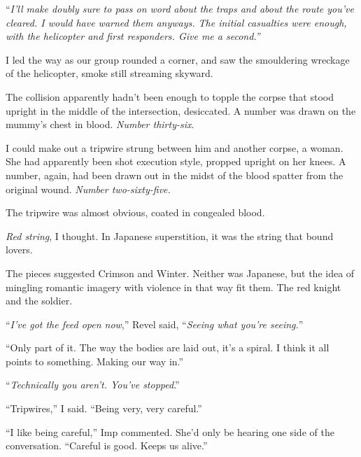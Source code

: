 ``\emph{I'll make doubly sure to pass on word about the traps and about the route you've cleared.  I would have warned them anyways.  The initial casualties were enough, with the helicopter and first responders.  Give me a second.''}



I led the way as our group rounded a corner, and saw the smouldering wreckage of the helicopter, smoke still streaming skyward.



The collision apparently hadn't been enough to topple the corpse that stood upright in the middle of the intersection, desiccated.  A number was drawn on the mummy's chest in blood.  \emph{Number thirty-six}.



I could make out a tripwire strung between him and another corpse, a woman.  She had apparently been shot execution style, propped upright on her knees.  A number, again, had been drawn out in the midst of the blood spatter from the original wound.  \emph{Number two-sixty-five.}



The tripwire was almost obvious, coated in congealed blood.



\emph{Red string}, I thought.  In Japanese superstition, it was the string that bound lovers.



The pieces suggested Crimson and Winter.  Neither was Japanese, but the idea of mingling romantic imagery with violence in that way fit them.  The red knight and the soldier.



``\emph{I've got the feed open now},'' Revel said, ``\emph{Seeing what you're seeing.}''



``Only part of it.  The way the bodies are laid out, it's a spiral.  I think it all points to something.  Making our way in.''



``\emph{Technically you aren't.  You've stopped}.''



``Tripwires,'' I said.  ``Being very, very careful.''



``I like being careful,'' Imp commented.  She'd only be hearing one side of the conversation.  ``Careful is good.  Keeps us alive.''



